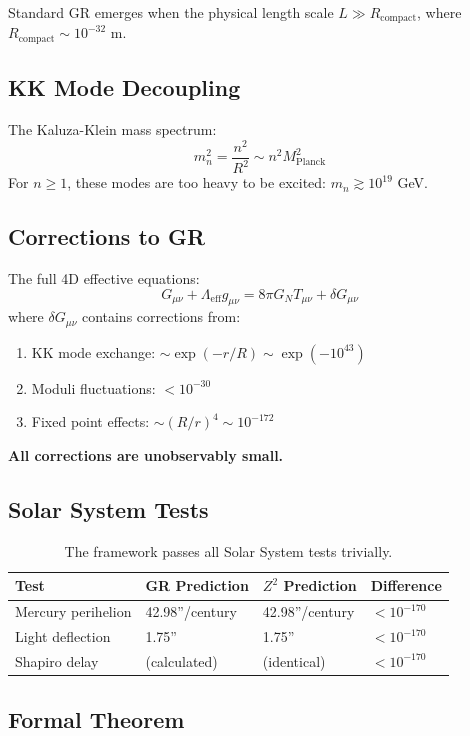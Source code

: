 \documentclass[11pt,a4paper]{article}
\theoremstyle{plain}
\theoremstyle{definition}
\theoremstyle{remark}
\begin{document}
Standard GR emerges when the physical length scale $L \gg R_{\text{compact}}$, where $R_{\text{compact}} \sim 10^{-32}$ m.

\subsection{KK Mode Decoupling}

The Kaluza-Klein mass spectrum:
\[
m_n^2 = \frac{n^2}{R^2} \sim n^2 M_{\text{Planck}}^2
\]
For $n \geq 1$, these modes are too heavy to be excited: $m_n \gtrsim 10^{19}$ GeV.

\subsection{Corrections to GR}

The full 4D effective equations:
\[
G_{\mu\nu} + \Lambda_{\text{eff}} g_{\mu\nu} = 8\pi G_N T_{\mu\nu} + \delta G_{\mu\nu}
\]
where $\delta G_{\mu\nu}$ contains corrections from:
\begin{enumerate}
  \item KK mode exchange: $\sim \exp(-r/R) \sim \exp(-10^{43})$
  \item Moduli fluctuations: $< 10^{-30}$
  \item Fixed point effects: $\sim (R/r)^4 \sim 10^{-172}$
\end{enumerate}
\textbf{All corrections are unobservably small.}

\subsection{Solar System Tests}

\begin{table}[h!]
\centering
\begin{tabular}{llll}
\toprule
\textbf{Test} & \textbf{GR Prediction} & \textbf{$Z^2$ Prediction} & \textbf{Difference} \\
\midrule
Mercury perihelion & 42.98''/century & 42.98''/century & $< 10^{-170}$ \\
Light deflection & 1.75'' & 1.75'' & $< 10^{-170}$ \\
Shapiro delay & (calculated) & (identical) & $< 10^{-170}$ \\
\bottomrule
\end{tabular}
\caption{The framework passes all Solar System tests trivially.}
\end{table}

\subsection{Formal Theorem}
\end{document}
